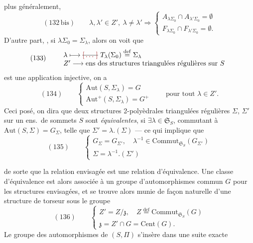 \documentclass[11pt,a4paper]{article}
\begin{document}
plus généralement, 
\[
  (132\,\text{bis})\qquad \lambda,\lambda'\in Z',\ \lambda\neq\lambda'
  \Longrightarrow
  \begin{cases}
    A_{\lambda\Sigma_0}\cap A_{\lambda'\Sigma_0} = \emptyset\\
    F_{\lambda\Sigma_0}\cap F_{\lambda'\Sigma_0} = \emptyset .
  \end{cases}
\]
 D'autre part, , si
$\lambda\Sigma_0=\Sigma_{\lambda}$, alors on voit que
\[
  (133)\qquad
  \begin{array}{l}
    \lambda \longmapsto \text{\struck{\ill{}}}\ T_{\lambda}(\Sigma_0)
      \overset{\mathrm{def}}{=} \Sigma_{\lambda}\\
    Z' \longrightarrow \text{ens des structures triangulées régulières sur } S
  \end{array}
\]
est une application injective, on a
\[
  (134)\qquad
  \begin{cases}
    \mathrm{Aut}(S,\Sigma_{\lambda}) = G\\
    \mathrm{Aut}^{+}(S,\Sigma_{\lambda}) = G^{+}
  \end{cases}
  \qquad \text{pour tout } \lambda\in Z' .
\]
Ceci posé, on dira que deux structures 2-polyèdrales triangulées régulières
$\Sigma$, $\Sigma'$  sur un ens.\ de sommets $S$ sont
\emph{équivalentes}, si $\exists\lambda\in\mathfrak{S}_S$, commutant à
$\mathrm{Aut}(S,\Sigma)=G_{\Sigma}$, telle que $\Sigma'=\lambda.(\Sigma)$ — ce qui
implique que
\[
  (135)\qquad
  \begin{cases}
    G_{\Sigma} = G_{\Sigma'}, \quad
      \lambda^{-1}\in\mathrm{Commut}_{\mathfrak{S}_S}(G_{\Sigma'})\\
    \Sigma = \lambda^{-1}.(\Sigma')
  \end{cases}
\]


de sorte que la relation envisagée est une relation d'équivalence. Une classe
d'équivalence  est alors associée à un groupe
d'automorphismes commun $G$ pour les structures envisagées, et se trouve alors
munie de façon naturelle d'une structure de torseur sous le groupe
\[
  (136)\qquad
  \begin{cases}
    Z' = Z/\mathfrak{z}, \quad
      Z \overset{\mathrm{def}}{=} \mathrm{Commut}_{\mathfrak{S}_S}(G)\\
    \mathfrak{z} = Z'\cap G = \mathrm{Cent}(G) .
  \end{cases}
\]
Le groupe des automorphismes de $(S,\Pi)$ 
 s'insère dans une suite exacte
\end{document}
